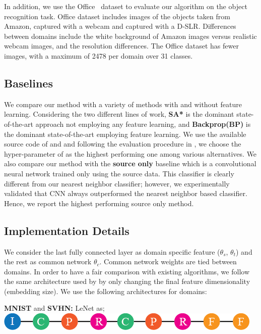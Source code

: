 In addition, we use the Office~\cite{office} dataset to evaluate our algorithm on the object recognition task. Office dataset includes images of the objects taken from Amazon, captured with a webcam and captured with a D-SLR. Differences between domains include the white background of Amazon images versus realistic webcam images, and the resolution differences. The Office dataset has fewer images, with a maximum of 2478 per domain over 31 classes. %

\subsection{Baselines}
We compare our method with a variety of methods with and without feature learning. Considering the two different lines of work, \textbf{SA*}\cite{fernando13} is the dominant state-of-the-art approach not employing any feature learning, and \textbf{Backprop(BP)}\cite{ganin15} is the dominant state-of-the-art employing feature learning. We use the available source code of \cite{ganin15} and \cite{fernando13} and following the evaluation procedure in \cite{ganin15}, we choose the hyper-parameter of \cite{fernando13} as the highest performing one among various alternatives. We also compare our method with the \textbf{source only} baseline which is a convolutional neural network trained only using the source data. This classifier is clearly different from our nearest neighbor classifier; however, we experimentally validated that CNN always outperformed the nearest neighbor based classifier. Hence, we report the highest performing source only method.

\subsection{Implementation Details}
\label{imp_det}
We consider the last fully connected layer as domain specific feature ($\theta_s$, $\theta_t$) and the rest as common network $\theta_c$. Common network weights are tied between domains. In order to have a fair comparison with existing algorithms, we follow the same architecture used by \cite{ganin15} by only changing the final feature dimensionality (embedding size). We use the following architectures for domains:

\noindent \textbf{MNIST} and \textbf{SVHN:} LeNet\cite{lenet} as; \includegraphics[width=0.5\columnwidth]{lenet}


